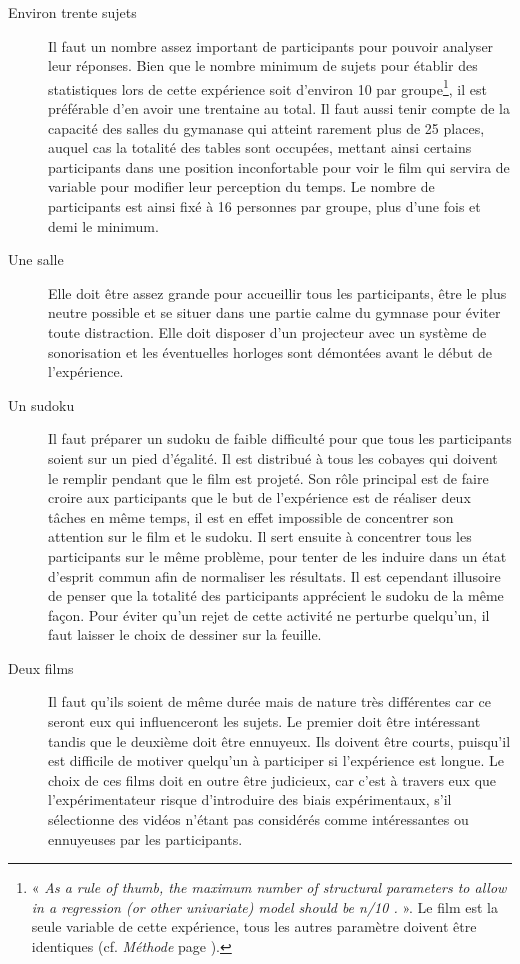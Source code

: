 \documentclass[12pt,fleqn,oneside,openany]{book} %
\begin{document}
\begin{description}
	\item[Environ trente sujets] Il faut un nombre assez important de participants pour pouvoir analyser leur réponses. Bien que le nombre minimum de sujets pour établir des statistiques lors de cette expérience soit d'environ 10 par groupe\footnote{« \emph{As a rule of thumb, the maximum number of structural parameters to allow in a regression (or other univariate) model should be \emph{n}/10 \emph{\cite{burnhamAnderson}}.} ». Le film est la seule variable de cette expérience, tous les autres paramètre doivent être identiques (cf. \emph{Méthode} page \pageref{sssec:methode1}).}, il est préférable d'en avoir une trentaine au total. Il faut aussi tenir compte de la capacité des salles du gymanase qui atteint rarement plus de 25 places, auquel cas la totalité des tables sont occupées, mettant ainsi certains participants dans une position inconfortable pour voir le film qui servira de variable pour modifier leur perception du temps. Le nombre de participants est ainsi fixé à 16 personnes par groupe, plus d'une fois et demi le minimum.
	\item[Une salle] Elle doit être assez grande pour accueillir tous les participants, être le plus neutre possible et se situer dans une partie calme du gymnase pour éviter toute distraction. Elle doit disposer d'un projecteur avec un système de sonorisation et les éventuelles horloges sont démontées avant le début de l'expérience.
	\item[Un sudoku] Il faut préparer un sudoku de faible difficulté pour que tous les participants soient sur un pied d'égalité. Il est distribué à tous les cobayes qui doivent le remplir pendant que le film est projeté. Son rôle principal est de faire croire aux participants que le but de l'expérience est de réaliser deux tâches en même temps, il est en effet impossible de concentrer son attention sur le film et le sudoku. Il sert ensuite à concentrer tous les participants sur le même problème, pour tenter de les induire dans un état d'esprit commun afin de normaliser les résultats. Il est cependant illusoire de penser que la totalité des participants apprécient le sudoku de la même façon. Pour éviter qu'un rejet de cette activité ne perturbe quelqu'un, il faut laisser le choix de dessiner sur la feuille.
	\item[Deux films] Il faut qu'ils soient de même durée mais de nature très différentes car ce seront eux qui influenceront les sujets. Le premier doit être intéressant tandis que le deuxième doit être ennuyeux. Ils doivent être courts, puisqu'il est difficile de motiver quelqu'un à participer si l'expérience est longue. Le choix de ces films doit en outre être judicieux, car c'est à travers eux que l'expérimentateur risque d'introduire des biais expérimentaux, s'il sélectionne des vidéos n'étant pas considérés comme intéressantes ou ennuyeuses par les participants. 


\end{description}
\end{document}
